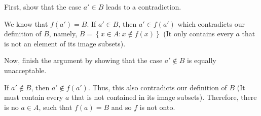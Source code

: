 \documentclass[12pt]{article}
\newenvironment{problem}[2][Problem]{\begin{trivlist} \item[\hskip \labelsep {\bfseries #1}\hskip \labelsep {\bfseries #2.}]}{\end{trivlist}}
\newenvironment{solution}[2][Solution]{\begin{trivlist} \item[\hskip \labelsep {\bfseries #1}\hskip \labelsep {\bfseries #2.}]}{\end{trivlist}}
\begin{document}
\begin{problem}{1.6.8}
  \begin{enumerate}[label=(\alph*)]
    \item First, show that the case $a'\in B$ leads to a contradiction.
      \begin{solution}{(a)}
	We know that $f(a')=B$. If $a'\in B$, then $a'\in f(a')$ which contradicts our definition of $B$, namely, $B=\left\{ x\in A: x\not\in f(x) \right\}$ (It only contains every $a$ that is not an element of its image subsets). 
      \end{solution}

    \item Now, finish the argument by showing that the case $a'\not\in B$ is equally unacceptable.
      \begin{solution}{(b)}
	If $a'\not\in B$, then $a'\not\in f(a')$. Thus, this also contradicts our definition of $B$ (It must contain every $a$ that is not contained in its image subsets). Therefore, there is no $a\in A$, such that $f(a)=B$ and so $f$ is not onto.  
      \end{solution}
  \end{enumerate}
\end{problem}
       
\end{document}
